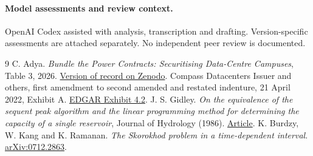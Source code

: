 \documentclass[11pt]{article}
\begin{document}
\paragraph{Model assessments and review context.} OpenAI Codex assisted with analysis, transcription and drafting. Version-specific assessments are attached separately. No independent peer review is documented.
\begin{thebibliography}{9}
 C. Adya. \emph{Bundle the Power Contracts: Securitising Data-Centre Campuses}, Table 3, 2026. \href{https://doi.org/10.5281/zenodo.24385766}{Version of record on Zenodo}.
 Compass Datacenters Issuer and others, first amendment to second amended and restated indenture, 21 April 2022, Exhibit A. \href{https://www.sec.gov/Archives/edgar/data/2105398/000110465926074624/tm264837d8_ex4-2.htm}{EDGAR Exhibit 4.2}.
 J. S. Gidley. \emph{On the equivalence of the sequent peak algorithm and the linear programming method for determining the capacity of a single reservoir}, Journal of Hydrology (1986). \href{https://doi.org/10.1016/0022-1694(86)90146-0}{Article}.
 K. Burdzy, W. Kang and K. Ramanan. \emph{The Skorokhod problem in a time-dependent interval}. \href{https://arxiv.org/abs/0712.2863}{arXiv:0712.2863}.
\end{thebibliography}
\end{document}
